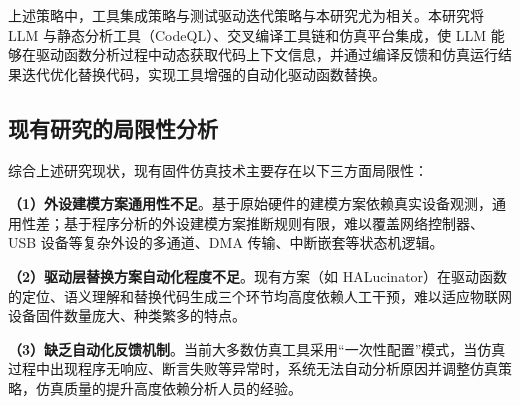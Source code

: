 上述策略中，工具集成策略与测试驱动迭代策略与本研究尤为相关。本研究将 LLM 与静态分析工具（CodeQL）、交叉编译工具链和仿真平台集成，使 LLM 能够在驱动函数分析过程中动态获取代码上下文信息，并通过编译反馈和仿真运行结果迭代优化替换代码，实现工具增强的自动化驱动函数替换。








\subsection{现有研究的局限性分析}
\label{sec:limitations}

综合上述研究现状，现有固件仿真技术主要存在以下三方面局限性：

\textbf{（1）外设建模方案通用性不足}。基于原始硬件的建模方案依赖真实设备观测，通用性差；基于程序分析的外设建模方案推断规则有限，难以覆盖网络控制器、USB 设备等复杂外设的多通道、DMA 传输、中断嵌套等状态机逻辑。

\textbf{（2）驱动层替换方案自动化程度不足}。现有方案（如 HALucinator）在驱动函数的定位、语义理解和替换代码生成三个环节均高度依赖人工干预，难以适应物联网设备固件数量庞大、种类繁多的特点。

\textbf{（3）缺乏自动化反馈机制}。当前大多数仿真工具采用“一次性配置”模式，当仿真过程中出现程序无响应、断言失败等异常时，系统无法自动分析原因并调整仿真策略，仿真质量的提升高度依赖分析人员的经验。

